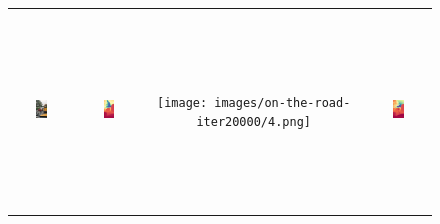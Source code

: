 \documentclass{article}
\begin{document}
\begin{figure}[H]
\begin{tabular}{cccc}
    \includegraphics[width=0.2\textwidth,height=5.2cm,keepaspectratio]{images/on-the-road/4.jpg} &
    \includegraphics[width=0.2\textwidth,height=5.2cm,keepaspectratio]{images/real_image_trained/depth_colored/4.png} &
    \texttt{[image: images/on-the-road-iter20000/4.png]} &
    \includegraphics[width=0.2\textwidth,height=5.2cm,keepaspectratio]{images/real_image/depth_colored/4.png} \\
  \end{tabular}
\end{figure}

\newpage
\end{document}

